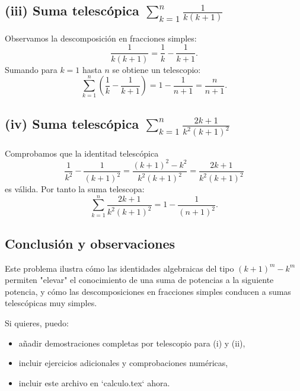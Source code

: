 \subsection*{(iii) Suma telescópica $\displaystyle\sum_{k=1}^n \frac{1}{k(k+1)}$}

Observamos la descomposición en fracciones simples:
\[
\frac{1}{k(k+1)}=\frac{1}{k}-\frac{1}{k+1}.
\]
Sumando para $k=1$ hasta $n$ se obtiene un telescopio:
\[
\sum_{k=1}^n \left(\frac{1}{k}-\frac{1}{k+1}\right)=1-\frac{1}{n+1}=\frac{n}{n+1}.
\]

\subsection*{(iv) Suma telescópica $\displaystyle\sum_{k=1}^n \frac{2k+1}{k^2(k+1)^2}$}

Comprobamos que la identitad telescópica
\[
\frac{1}{k^2}-\frac{1}{(k+1)^2}=\frac{(k+1)^2-k^2}{k^2(k+1)^2}=\frac{2k+1}{k^2(k+1)^2}
\]
es válida. Por tanto la suma telescopa:
\[
\sum_{k=1}^n \frac{2k+1}{k^2(k+1)^2}=1-\frac{1}{(n+1)^2}.
\]

\subsection*{Conclusión y observaciones}

Este problema ilustra cómo las identidades algebraicas del tipo $(k+1)^m-k^m$ permiten "elevar" el conocimiento de una suma de potencias a la siguiente potencia, y cómo las descomposiciones en fracciones simples conducen a sumas telescópicas muy simples.

Si quieres, puedo:
\begin{itemize}
    \item añadir demostraciones completas por telescopio para (i) y (ii),
    \item incluir ejercicios adicionales y comprobaciones numéricas,
    \item incluir este archivo en `calculo.tex` ahora.
\end{itemize}
